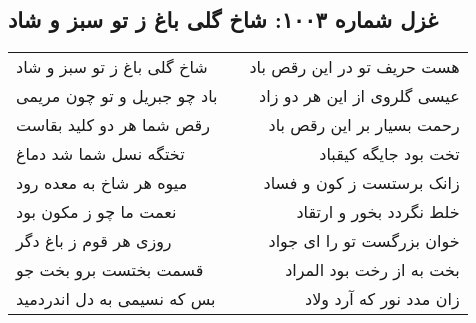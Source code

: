 \begin{center}
\section*{غزل شماره ۱۰۰۳: شاخ گلی باغ ز تو سبز و شاد}
\label{sec:1003}
\begin{longtable}{l p{0.5cm} r}
شاخ گلی باغ ز تو سبز و شاد
&&
هست حریف تو در این رقص باد
\\
باد چو جبریل و تو چون مریمی
&&
عیسی گلروی از این هر دو زاد
\\
رقص شما هر دو کلید بقاست
&&
رحمت بسیار بر این رقص باد
\\
تختگه نسل شما شد دماغ
&&
تخت بود جایگه کیقباد
\\
میوه هر شاخ به معده رود
&&
زانک برستست ز کون و فساد
\\
نعمت ما چو ز مکون بود
&&
خلط نگردد بخور و ارتقاد
\\
روزی هر قوم ز باغ دگر
&&
خوان بزرگست تو را ای جواد
\\
قسمت بختست برو بخت جو
&&
بخت به از رخت بود المراد
\\
بس که نسیمی به دل اندردمید
&&
زان مدد نور که آرد ولاد
\\
\end{longtable}
\end{center}
